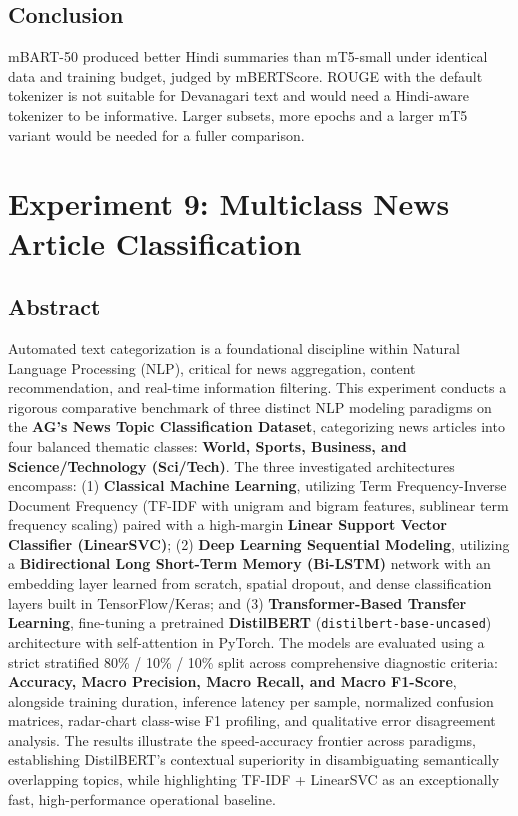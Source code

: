 \documentclass[12pt,a4paper,oneside]{report}
\begin{document}
\section{Conclusion}
mBART-50 produced better Hindi summaries than mT5-small under identical data and training budget, judged by mBERTScore. ROUGE with the default tokenizer is not suitable for Devanagari text and would need a Hindi-aware tokenizer to be informative. Larger subsets, more epochs and a larger mT5 variant would be needed for a fuller comparison.


\chapter{Experiment 9: Multiclass News Article Classification}
\section{Abstract}
Automated text categorization is a foundational discipline within Natural Language Processing (NLP), critical for news aggregation, content recommendation, and real-time information filtering. This experiment conducts a rigorous comparative benchmark of three distinct NLP modeling paradigms on the \textbf{AG's News Topic Classification Dataset}, categorizing news articles into four balanced thematic classes: \textbf{World, Sports, Business, and Science/Technology (Sci/Tech)}. The three investigated architectures encompass: (1) \textbf{Classical Machine Learning}, utilizing Term Frequency-Inverse Document Frequency (TF-IDF with unigram and bigram features, sublinear term frequency scaling) paired with a high-margin \textbf{Linear Support Vector Classifier (LinearSVC)}; (2) \textbf{Deep Learning Sequential Modeling}, utilizing a \textbf{Bidirectional Long Short-Term Memory (Bi-LSTM)} network with an embedding layer learned from scratch, spatial dropout, and dense classification layers built in TensorFlow/Keras; and (3) \textbf{Transformer-Based Transfer Learning}, fine-tuning a pretrained \textbf{DistilBERT} (\texttt{distilbert-base-uncased}) architecture with self-attention in PyTorch. The models are evaluated using a strict stratified 80\% / 10\% / 10\% split across comprehensive diagnostic criteria: \textbf{Accuracy, Macro Precision, Macro Recall, and Macro F1-Score}, alongside training duration, inference latency per sample, normalized confusion matrices, radar-chart class-wise F1 profiling, and qualitative error disagreement analysis. The results illustrate the speed-accuracy frontier across paradigms, establishing DistilBERT's contextual superiority in disambiguating semantically overlapping topics, while highlighting TF-IDF + LinearSVC as an exceptionally fast, high-performance operational baseline.
\end{document}
